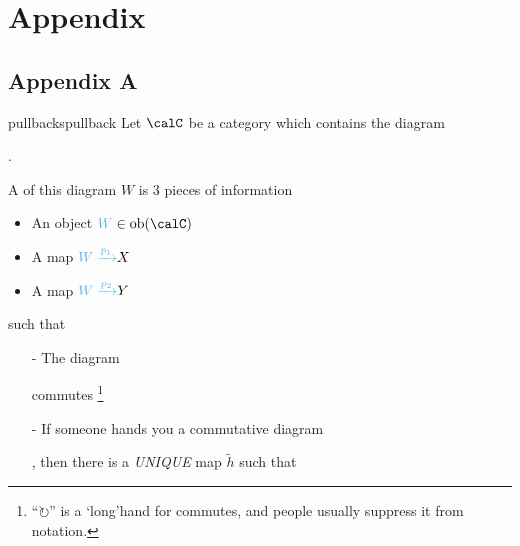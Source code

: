 \chapter{Appendix}
\newpage
\section{Appendix A}
\newcommand{\scottycomment}[1]{\footnote{#1}}
\begin{definition}{pullbacks}{pullback}
    Let $\calC$ be a category which contains the diagram \begin{center}
      .
    \end{center}
    A  of this diagram $W$ is 3 pieces of information
    \begin{itemize}
        \item An object $\textcolor{wonglightblue}{W}\in \text{ob}(\calC)$
        \item A map $\textcolor{wonglightblue}{W\xr{p_1}}X$
        \item A map $\textcolor{wonglightblue}{W\xr{p_2}}Y$
    \end{itemize} such that 
    \begin{itemize}
        \item[-] The diagram    commutes \scottycomment{``$\circlearrowright$'' is a `long'hand for commutes, and people usually suppress it from notation.}
          \item[-] If someone hands you a commutative diagram , then there is a \emph{UNIQUE} map $\tilde{h}$ such that \begin{tikzcd}[ampersand replacement = \&,background color = wonglightblue!5]

\end{tikzcd}
\end{itemize}
\end{definition}

